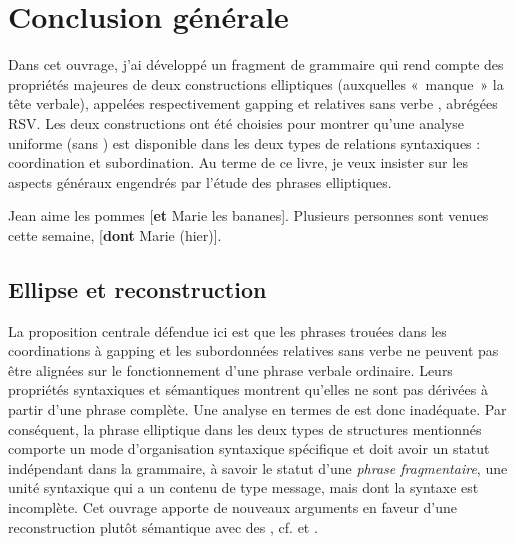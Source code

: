 \chapter{Conclusion générale} \label{concl}


Dans cet ouvrage, j’ai développé un fragment de grammaire qui rend compte des propriétés majeures de deux constructions elliptiques (auxquelles «~manque~» la tête verbale), appelées respectivement gapping  et relatives sans verbe , abrégées RSV. Les deux constructions ont été choisies pour montrer qu’une analyse uniforme (sans ) est disponible dans les deux types de relations syntaxiques : coordination et subordination. Au terme de ce livre, je veux insister sur les aspects généraux engendrés par l’étude des phrases elliptiques. 

\ea \label{concl:ex1}
\ea
Jean aime les pommes [\textbf{et} Marie les bananes]. \label{concl:ex1a}
\ex
Plusieurs personnes sont venues cette semaine, [\textbf{dont} Marie (hier)]. \label{concl:ex1b}
\z 
\z 


\section{Ellipse et reconstruction} \label{concl:sect1}


La proposition centrale défendue ici est que les phrases trouées dans les coordinations à gapping et les subordonnées relatives sans verbe ne peuvent pas être alignées sur le fonctionnement d’une phrase verbale ordinaire. Leurs propriétés syntaxiques et sémantiques montrent qu’elles ne sont pas dérivées à partir d’une phrase complète. Une analyse en termes de  est donc inadéquate. Par conséquent, la phrase elliptique dans les deux types de structures mentionnés comporte un mode d’organisation syntaxique spécifique et doit avoir un statut indépendant dans la grammaire, à savoir le statut d’une \textit{phrase fragmentaire}, {\cad} une unité syntaxique qui a un contenu de type message, mais dont la syntaxe est incomplète. Cet ouvrage apporte de nouveaux arguments en faveur d’une reconstruction plutôt sémantique avec des , cf. \citet{GinzburgEtAl2000} et \citet{CulicoverEtAl2005}.

